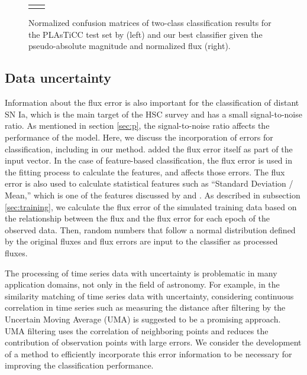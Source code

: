 \documentclass[useamsfonts]{pasj01}
\begin{document}
\begin{figure}[htbp]
\begin{tabular}{cc}
\begin{minipage}{0.5\hsize}
\begin{center}
            \end{center}
        \end{minipage}
    \end{tabular}  \caption{%
    Normalized confusion matrices of two-class classification results for the PLAsTiCC test set by \citet{boone19a} (left) and our best classifier given the pseudo-absolute magnitude and normalized flux (right).
    }%
    \label{fig:comp_plasticc_1st}
\end{figure}
%
%
%
%
\subsection{Data uncertainty}
%
Information about the flux error is also important for the classification of distant SN Ia, which is the main target of the HSC survey and has a small signal-to-noise ratio.
As mentioned in section \ref{sec:p}, the signal-to-noise ratio affects the performance of the model.
%
Here, we discuss the incorporation of errors for classification, including in our method.
\citet{charnock17a} added the flux error itself as part of the input vector.
In the case of feature-based classification, the flux error is used in the fitting process to calculate the features, and affects those errors.
The flux error is also used to calculate statistical features such as ``Standard Deviation / Mean,'' which is one of the features discussed by \citet{narayan18a} and \citet{Muthukrishna_2019}.
As described in subsection \ref{sec:training}, we calculate the flux error of the simulated training data based on the relationship between the flux and the flux error for each epoch of the observed data.
Then, random numbers that follow a normal distribution defined by the original fluxes and flux errors are input to the classifier as processed fluxes.

The processing of time series data with uncertainty is problematic in many application domains, not only in the field of astronomy.
For example, in the similarity matching of time series data with uncertainty,  considering continuous correlation in time series such as measuring the distance after filtering by the Uncertain Moving Average (UMA)\citep{Dallachiesa_2012} is suggested to be a promising approach.
UMA filtering uses the correlation of neighboring points and reduces the contribution of observation points with large errors.
We consider the development of a method to efficiently incorporate this error information to be necessary for improving the classification performance.
%
\end{document}
